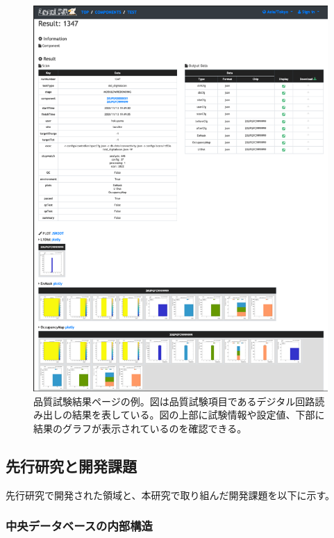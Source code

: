 \begin{figure}[bpt]\centering
\includegraphics[width=14cm]{viewer_result}
\caption[品質試験結果ページの例]{品質試験結果ページの例。図は品質試験項目であるデジタル回路読み出しの結果を表している。図の上部に試験情報や設定値、下部に結果のグラフが表示されているのを確認できる。}
\label{viewer_result}
\end{figure}


\clearpage
\subsection{先行研究と開発課題}
先行研究で開発された領域と、本研究で取り組んだ開発課題を以下に示す。

\subsubsection{中央データベースの内部構造}
